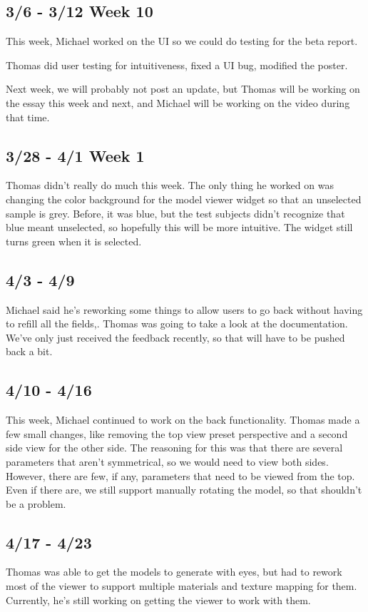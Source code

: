 \documentclass[letterpaper,10pt, onecolumn, draftclsnofoot]{IEEEtran}
\begin{document}
\subsection{3/6 - 3/12 Week 10}
This week, Michael worked on the UI so we could do testing for the beta report.

Thomas did user testing for intuitiveness, fixed a UI bug, modified the poster.

Next week, we will probably not post an update, but Thomas will be working on the essay this week and next, and Michael will be working on the video during that time.

\subsection{3/28 - 4/1 Week 1}
Thomas didn't really do much this week. The only thing he worked on was changing the color background for the model viewer widget so that an unselected sample is grey. Before, it was blue, but the test subjects didn't recognize that blue meant unselected, so hopefully this will be more intuitive. The widget still turns green when it is selected.

\subsection{4/3 - 4/9}
Michael said he's reworking some things to allow users to go back without having to refill all the fields,. Thomas was going to take a look at the documentation. We've only just received the feedback recently, so that will have to be pushed back a bit.

\subsection{4/10 - 4/16}
This week, Michael continued to work on the back functionality. Thomas made a few small changes, like removing the top view preset perspective and a second side view for the other side. The reasoning for this was that there are several parameters that aren't symmetrical, so we would need to view both sides. However, there are few, if any, parameters that need to be viewed from the top. Even if there are, we still support manually rotating the model, so that shouldn't be a problem.

\subsection{4/17 - 4/23}
Thomas was able to get the models to generate with eyes, but had to rework most of the viewer to support multiple materials and texture mapping for them. Currently, he's still working on getting the viewer to work with them.
\end{document}
